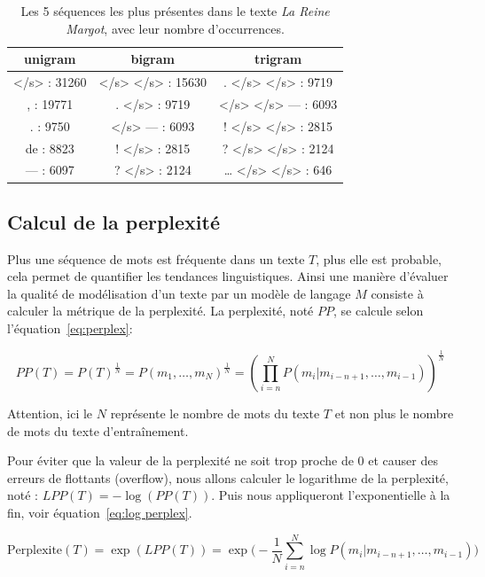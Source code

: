 \documentclass[a4paper]{article}
\begin{document}
\begin{table}[ht]
    \centering
    \begin{tabular}{|c|c|c|}
        \hline
         unigram & bigram & trigram \\
         \hline
         </s> : 31260& </s> </s> : 15630 & . </s> </s> : 9719\\
         , : 19771 & . </s> : 9719 & </s> </s> — : 6093\\
         . : 9750 & </s> — : 6093 & ! </s> </s> : 2815\\
         de : 8823 & ! </s> : 2815 & ? </s> </s> : 2124\\
         — : 6097 & ? </s> : 2124 & … </s> </s> : 646\\
         \hline
    \end{tabular}
    \caption{Les 5 séquences les plus présentes dans le texte \textit{La Reine Margot}, avec leur nombre d'occurrences.}
    \label{tab:sequence}
\end{table}


\subsection{Calcul de la perplexité}
Plus une séquence de mots est fréquente dans un texte $T$, plus elle est probable, cela permet de quantifier les tendances 
linguistiques. Ainsi une manière d'évaluer la qualité de modélisation d'un texte par un modèle de langage $M$ consiste à calculer 
la métrique de la perplexité. La perplexité, noté $PP$, se calcule selon l'équation~\ref{eq:perplex}:

\begin{equation}
    PP(T) = P(T)^{\frac{1}{N}} = P(m_1,\dots,m_N)^{\frac{1}{N}} = (\prod_{i=n}^{N} P(m_i|m_{i-n+1},\dots,m_{i-1}))^{\frac{1}{N}}
    \label{eq:perplex}
\end{equation}

Attention, ici le $N$ représente le nombre de mots du texte $T$ et non plus le nombre de mots du texte d'entraînement.

Pour éviter que la valeur de la perplexité ne soit trop proche de 0 et causer des erreurs de flottants (overflow), nous allons 
calculer le logarithme de la perplexité, noté : $LPP(T) = -\log(PP(T))$. Puis nous appliqueront l'exponentielle à la fin, voir équation~\ref{eq:log perplex}.

\begin{equation}
    \text{Perplexite}(T) = \exp (LPP(T)) =  \exp \biggl(- \frac{1}{N} \sum_{i=n}^{N} \log P(m_i|m_{i-n+1},\dots,m_{i-1})\biggl)
    \label{eq:log perplex}
\end{equation}
\end{document}
